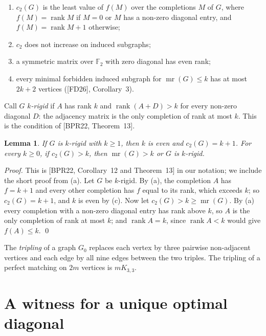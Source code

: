 \documentclass[11pt,letterpaper,reqno]{amsart}
\providecommand{\tightlist}{\setlength{\itemsep}{1pt}\setlength{\parskip}{0pt}}
\theoremstyle{spaced}
\newtheorem{lemma}{Lemma}
\begin{document}
\begin{enumerate}[label=\textup{(\alph*)},nosep]
\tightlist
\item
  \(c_2(G)\) is the least value of \(f(M)\) over the completions \(M\) of \(G\), where \(f(M) = \operatorname{rank} M\) if \(M = 0\) or \(M\) has a non-zero diagonal entry, and \(f(M) = \operatorname{rank} M + 1\) otherwise;
\item
  \(c_2\) does not increase on induced subgraphs;
\item
  a symmetric matrix over \(\mathbb{F}_2\) with zero diagonal has even rank;
\item
  every minimal forbidden induced subgraph for \(\operatorname{mr}(G) \le k\) has at most \(2k+2\) vertices ({[}FD26{]}, Corollary~3).
\end{enumerate}

Call \(G\) \emph{\(k\)-rigid} if \(A\) has rank \(k\) and \(\operatorname{rank}(A + D) > k\) for every non-zero diagonal \(D\): the adjacency matrix is the only completion of rank at most \(k\). This is the condition of {[}BPR22, Theorem~13{]}.

\begin{lemma}
If \(G\) is \(k\)-rigid with \(k \ge 1\), then \(k\) is even and \(c_2(G) = k+1\). For every \(k \ge 0\), if \(c_2(G) > k\), then \(\operatorname{mr}(G) > k\) or \(G\) is \(k\)-rigid.
\end{lemma}

\emph{Proof.} This is {[}BPR22, Corollary~12 and Theorem~13{]} in our notation; we include the short proof from (a). Let \(G\) be \(k\)-rigid. By (a), the completion \(A\) has \(f = k+1\) and every other completion has \(f\) equal to its rank, which exceeds \(k\); so \(c_2(G) = k+1\), and \(k\) is even by (c). Now let \(c_2(G) > k \ge \operatorname{mr}(G)\). By (a) every completion with a non-zero diagonal entry has rank above \(k\), so \(A\) is the only completion of rank at most \(k\); and \(\operatorname{rank} A = k\), since \(\operatorname{rank} A < k\) would give \(f(A) \le k\). \qed

The \emph{tripling} of a graph \(G_0\) replaces each vertex by three pairwise non-adjacent vertices and each edge by all nine edges between the two triples. The tripling of a perfect matching on \(2m\) vertices is \(mK_{3,3}\).

\hypertarget{a-witness-for-a-unique-optimal-diagonal}{%
\section{A witness for a unique optimal diagonal}\label{a-witness-for-a-unique-optimal-diagonal}}
\end{document}
